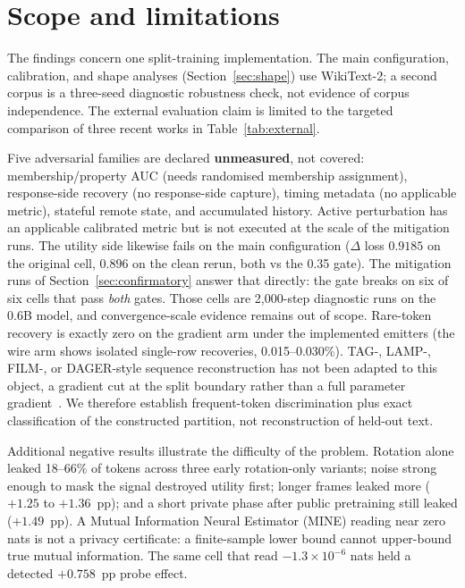 \documentclass[11pt]{article}
\newcommand{\pp}{pp}
\begin{document}
\section{Scope and limitations}
\label{sec:scope}

The findings concern one split-training implementation. The main configuration,
calibration, and shape analyses (Section~\ref{sec:shape}) use WikiText-2; a second corpus is a three-seed
diagnostic robustness check, not evidence of corpus independence. The external
evaluation claim is limited to the targeted comparison of three recent works in
Table~\ref{tab:external}.

Five adversarial families are declared \textbf{unmeasured}, not covered:
membership/property AUC (needs randomised membership assignment), response-side
recovery (no response-side capture), timing metadata (no applicable metric),
stateful remote state, and accumulated history. Active perturbation has an
applicable calibrated metric but is not executed at the scale of the mitigation runs. The
utility side likewise fails on the main configuration ($\Delta$ loss $0.9185$
on the original cell, $0.896$ on the clean rerun, both vs the
0.35 gate). The mitigation runs of
Section~\ref{sec:confirmatory} answer that directly: the gate breaks on six of six cells that pass \emph{both} gates.
Those cells are 2{,}000-step diagnostic runs on the 0.6B model, and
convergence-scale evidence remains out of scope. Rare-token recovery is exactly
zero on the gradient arm under the implemented emitters (the wire arm shows
isolated single-row recoveries, 0.015--0.030\%). TAG-, LAMP-, FILM-, or
DAGER-style sequence reconstruction has not been adapted to this object, a
gradient cut at the split boundary rather than a full parameter
gradient~\cite{deng2021tag,balunovic2022lamp,gupta2022film,petrov2024dager}.
We therefore establish frequent-token discrimination plus exact classification
of the constructed partition, not reconstruction of held-out text.

Additional negative results illustrate the difficulty of the problem. Rotation
alone leaked 18--66\% of tokens across three early rotation-only variants; noise
strong enough to mask the signal destroyed utility first; longer frames leaked
more ($+1.25$ to $+1.36$~\pp{}); and a short private phase after public
pretraining still leaked ($+1.49$~\pp{}). A Mutual Information Neural Estimator
(MINE) reading near zero nats is not a privacy certificate: a finite-sample
lower bound cannot upper-bound true mutual information. The same cell that read
$-1.3\times10^{-6}$ nats held a detected $+0.758$~\pp{} probe effect.
\end{document}
